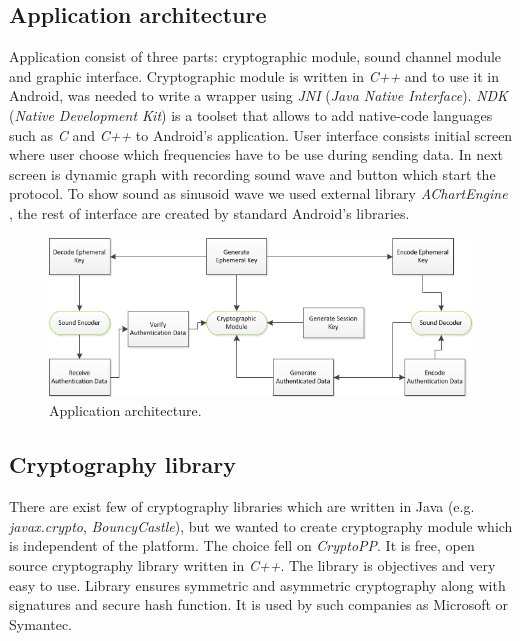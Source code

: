 \documentclass[11pt,titlepage]{article}
\theoremstyle{plain}
\begin{document}
\subsection{Application architecture}

Application consist of three parts: cryptographic module, sound channel module and graphic interface. Cryptographic module is written in \textit{C++} and to use it in Android, was needed to write a wrapper using \textit{JNI} (\textit{Java Native Interface}). \textit{NDK} (\textit{Native Development Kit}) is a toolset that allows to add native-code languages such as \textit{C} and \textit{C++} to Android's application. User interface consists initial screen where user choose which frequencies have to be use during sending data. In next screen is dynamic graph with recording sound wave and button which start the protocol. To show sound as sinusoid wave we used external library \textit{AChartEngine} \cite{chart_eng}, the rest of interface are created by standard Android's libraries.

\vspace{5mm}

\begin{figure}[H]
	\centering
	\includegraphics[width=1\textwidth]{img/architecture}
	\caption{Application architecture.}
\end{figure}

\subsection{Cryptography library}

There are exist few of cryptography libraries which are written in Java (e.g. \textit{javax.crypto}, \textit{BouncyCastle}), but we wanted to create cryptography module which is independent of the platform. The choice fell on \textit{CryptoPP}. It is free, open source cryptography library written in \textit{C++}. The library is objectives and very easy to use. Library ensures symmetric and asymmetric cryptography along with signatures and secure hash function. It is used by such companies as Microsoft or Symantec.
\end{document}
